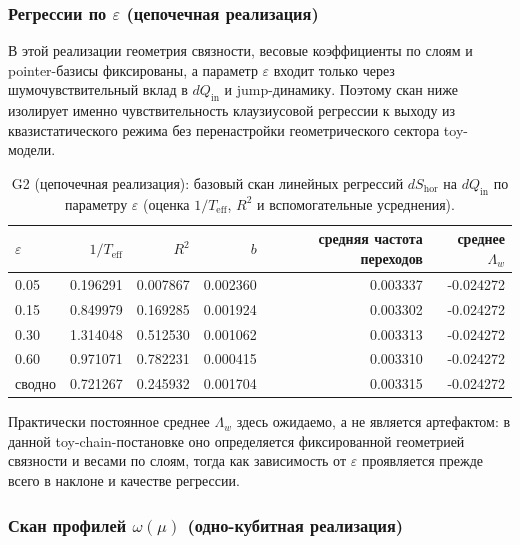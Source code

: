 \documentclass[11pt,a4paper]{article}
\theoremstyle{definition}
\theoremstyle{plain}
\theoremstyle{remark}
\begin{document}
\subsubsection[Регрессии по epsilon (цепочечная реализация)]{Регрессии по $\varepsilon$ (цепочечная реализация)}
\label{sec:numerics:G2eps}

В этой реализации геометрия связности, весовые коэффициенты по слоям и pointer-базисы фиксированы,
а параметр $\varepsilon$ входит только через шумочувствительный вклад в $dQ_{\mathrm{in}}$
и jump-динамику. Поэтому скан ниже изолирует именно чувствительность клаузиусовой регрессии
к выходу из квазистатического режима без перенастройки геометрического сектора toy-модели.

\begin{table}[t]
\centering
\caption{G2 (цепочечная реализация): базовый скан линейных регрессий
$dS_{\mathrm{hor}}$ на $dQ_{\mathrm{in}}$ по параметру $\varepsilon$
(оценка $1/T_{\mathrm{eff}}$, $R^2$ и вспомогательные усреднения).}
\label{tab:G2eps}
\begin{tabular}{@{}lrrrrr@{}}
\toprule
$\varepsilon$ & $1/T_{\mathrm{eff}}$ & $R^2$ & $b$ & средняя частота переходов & среднее $\Lambda_w$ \\
\midrule
0.05  & 0.196291 & 0.007867 & 0.002360 & 0.003337 & -0.024272 \\
0.15  & 0.849979 & 0.169285 & 0.001924 & 0.003302 & -0.024272 \\
0.30  & 1.314048 & 0.512530 & 0.001062 & 0.003313 & -0.024272 \\
0.60  & 0.971071 & 0.782231 & 0.000415 & 0.003310 & -0.024272 \\
\midrule
сводно & 0.721267 & 0.245932 & 0.001704 & 0.003315 & -0.024272 \\
\bottomrule
\end{tabular}
\end{table}

Практически постоянное среднее $\Lambda_w$ здесь ожидаемо, а не является артефактом:
в данной toy-chain-постановке оно определяется фиксированной геометрией связности и весами по слоям,
тогда как зависимость от $\varepsilon$ проявляется прежде всего в наклоне и качестве регрессии.

\subsubsection[Скан профилей omega(mu) (одно-кубитная реализация)]{Скан профилей $\omega(\mu)$ (одно-кубитная реализация)}
\label{sec:numerics:G2profiles}
\end{document}
